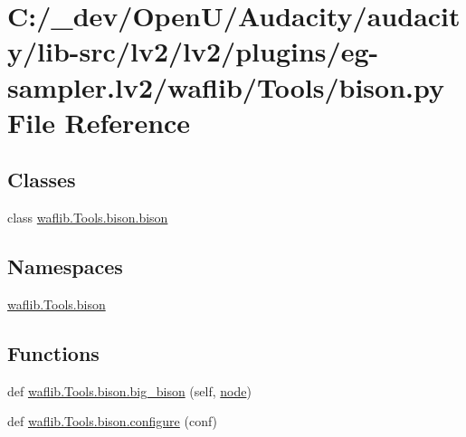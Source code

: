 \hypertarget{lv2_2plugins_2eg-sampler_8lv2_2waflib_2_tools_2bison_8py}{}\section{C\+:/\+\_\+dev/\+Open\+U/\+Audacity/audacity/lib-\/src/lv2/lv2/plugins/eg-\/sampler.lv2/waflib/\+Tools/bison.py File Reference}
\label{lv2_2plugins_2eg-sampler_8lv2_2waflib_2_tools_2bison_8py}
\subsection*{Classes}
\begin{DoxyCompactItemize}
\item 
class \hyperlink{classwaflib_1_1_tools_1_1bison_1_1bison}{waflib.\+Tools.\+bison.\+bison}
\end{DoxyCompactItemize}
\subsection*{Namespaces}
\begin{DoxyCompactItemize}
\item 
 \hyperlink{namespacewaflib_1_1_tools_1_1bison}{waflib.\+Tools.\+bison}
\end{DoxyCompactItemize}
\subsection*{Functions}
\begin{DoxyCompactItemize}
\item 
def \hyperlink{namespacewaflib_1_1_tools_1_1bison_ab34716254c6b552f235c340bad47b596}{waflib.\+Tools.\+bison.\+big\+\_\+bison} (self, \hyperlink{structnode}{node})
\item 
def \hyperlink{namespacewaflib_1_1_tools_1_1bison_af8585015f181d6117510d086dd42623a}{waflib.\+Tools.\+bison.\+configure} (conf)
\end{DoxyCompactItemize}
